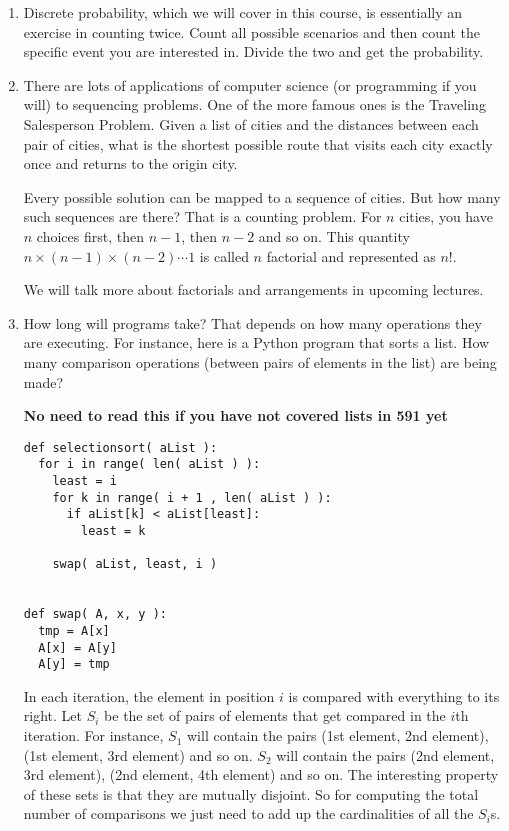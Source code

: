 \documentclass[12pt]{article}
\begin{document}
\begin{enumerate}
\item Discrete probability, which we will cover in this course, is essentially an exercise in counting twice. Count all possible scenarios and then count the specific event you are interested in. Divide the two and get the probability.
\item There are lots of applications of computer science (or programming if you will) to sequencing problems. One of the more famous ones is the Traveling Salesperson Problem.  Given a list of cities and the distances between each pair of cities, what is the shortest possible route that visits each city exactly once and returns to the origin city. 

Every possible solution can be mapped to a sequence of cities. But how many such sequences are there? That is a counting problem. For $n$ cities, you have $n$ choices first, then $n-1$, then $n-2$ and so on. This quantity $n \times (n-1) \times (n-2) \cdots 1$ is called $n$ factorial and represented as $n!$. 

We will talk more about factorials and arrangements in upcoming lectures.

\item How long will programs take? That depends on how many operations they are executing. For instance, here is a Python program that sorts a list. How many comparison operations (between pairs of elements in the list) are being made? 

\textbf{No need to read this if you have not covered lists in 591 yet}


\begin{verbatim}
def selectionsort( aList ):
  for i in range( len( aList ) ):
    least = i
    for k in range( i + 1 , len( aList ) ):
      if aList[k] < aList[least]:
        least = k
 
    swap( aList, least, i )
 
 
def swap( A, x, y ):
  tmp = A[x]
  A[x] = A[y]
  A[y] = tmp

\end{verbatim}

In each iteration, the element in position $i$ is compared with everything to its right. 
Let $S_i$ be the set of pairs of elements that get compared in the $i$th iteration. For instance, $S_1$ will contain the pairs (1st element, 2nd element), (1st element, 3rd element) and so on. 
$S_2$ will contain the pairs (2nd element, 3rd element), (2nd element, 4th element) and so on.
The interesting property of these sets is that they are mutually disjoint. So for computing the total number of comparisons we just need to add up the cardinalities of all the $S_i$s.


\end{enumerate}
\end{document}
